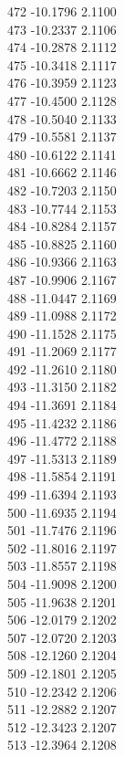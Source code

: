 \documentclass[11pt]{article}
\theoremstyle{definition}
\theoremstyle{plain}
\begin{document}
{472 -10.1796 2.1100\\
473 -10.2337 2.1106\\
474 -10.2878 2.1112\\
475 -10.3418 2.1117\\
476 -10.3959 2.1123\\
477 -10.4500 2.1128\\
478 -10.5040 2.1133\\
479 -10.5581 2.1137\\
480 -10.6122 2.1141\\
481 -10.6662 2.1146\\
482 -10.7203 2.1150\\
483 -10.7744 2.1153\\
484 -10.8284 2.1157\\
485 -10.8825 2.1160\\
486 -10.9366 2.1163\\
487 -10.9906 2.1167\\
488 -11.0447 2.1169\\
489 -11.0988 2.1172\\
490 -11.1528 2.1175\\
491 -11.2069 2.1177\\
492 -11.2610 2.1180\\
493 -11.3150 2.1182\\
494 -11.3691 2.1184\\
495 -11.4232 2.1186\\
496 -11.4772 2.1188\\
497 -11.5313 2.1189\\
498 -11.5854 2.1191\\
499 -11.6394 2.1193\\
500 -11.6935 2.1194\\
501 -11.7476 2.1196\\
502 -11.8016 2.1197\\
503 -11.8557 2.1198\\
504 -11.9098 2.1200\\
505 -11.9638 2.1201\\
506 -12.0179 2.1202\\
507 -12.0720 2.1203\\
508 -12.1260 2.1204\\
509 -12.1801 2.1205\\
510 -12.2342 2.1206\\
511 -12.2882 2.1207\\
512 -12.3423 2.1207\\
513 -12.3964 2.1208\\
}
\end{document}
